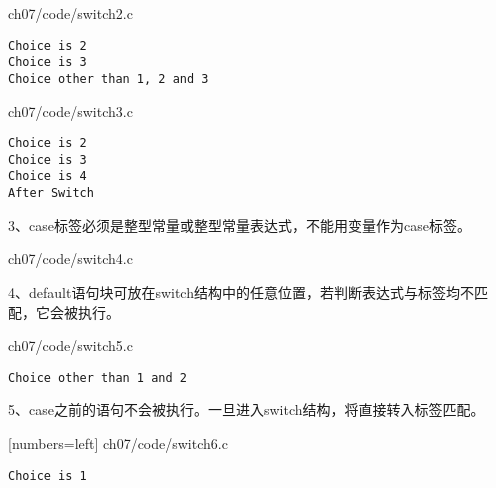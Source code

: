 \begin{frame}[fragile]\ft{\secname}
  
  {ch07/code/switch2.c}
\end{frame}

\begin{frame}[fragile]\ft{\secname}
\begin{lstlisting}
Choice is 2
Choice is 3
Choice other than 1, 2 and 3
\end{lstlisting}

\end{frame}

\begin{frame}[fragile]\ft{\secname}
  
  {ch07/code/switch3.c}
\end{frame}

\begin{frame}[fragile]\ft{\secname}
\begin{lstlisting}
Choice is 2
Choice is 3
Choice is 4
After Switch
\end{lstlisting}
\end{frame}


\begin{frame}[fragile]\ft{\secname}
3、case标签必须是整型常量或整型常量表达式，不能用变量作为case标签。
\end{frame}

\begin{frame}[fragile]\ft{\secname}
  
  {ch07/code/switch4.c}
\end{frame}

\begin{frame}[fragile]\ft{\secname}
4、default语句块可放在switch结构中的任意位置，若判断表达式与标签均不匹配，它会被执行。
\end{frame}

\begin{frame}[fragile]\ft{\secname}
  
  {ch07/code/switch5.c} \pause 
\begin{lstlisting}
Choice other than 1 and 2
\end{lstlisting}
\end{frame}


\begin{frame}\ft{\secname}
5、case之前的语句不会被执行。一旦进入switch结构，将直接转入标签匹配。
\end{frame}

\begin{frame}\ft{\secname}

[numbers=left]
{ch07/code/switch6.c}
\begin{lstlisting}
Choice is 1
\end{lstlisting}
\end{frame}

